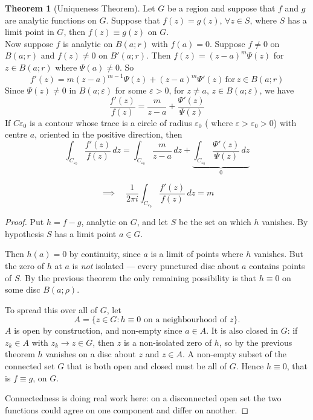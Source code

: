 \documentclass[11pt,a4paper]{article}
\theoremstyle{definition}
\newtheorem{thm}{Theorem}[section]
\begin{document}
\begin{thm}[Uniqueness Theorem]
Let $G$ be a region and suppose that $f$ and $g$ are analytic functions on $G$. Suppose that $f(z) = g(z),\,\forall z \in S$, where $S$ has a limit point in $G$, then $f(z) \equiv g(z)$ on $G$.\\

Now suppose $f$ is analytic on $B(a;r)$  with $f(a) = 0$.
Suppose $f\neq 0$ on $B(a;r)$ and $f(z)\neq 0$ on $B'(a;r)$.  Then $f(z) = (z - a)^m\Psi (z)$ for $z \in B(a;r)$ where $\Psi (a)\neq 0$. So $$f'(z) = m(z - a)^{m-1}\Psi (z) + (z- a)^m\Psi'(z)\,\text{for}\, z \in B(a;r)$$
Since $\Psi (z) \neq 0$ in $B(a;\varepsilon)$ for some $\varepsilon > 0$, for $z \neq a, \, z\in B(a;\varepsilon)$, we have $$\frac{f'(z)}{f(z)} = \frac{m}{z - a} + \frac{\Psi' (z)}{\Psi (z)}$$
If $C{\varepsilon_0}$ is a contour whose trace is a circle of radius $\varepsilon_0$ ( where $\varepsilon > \varepsilon_0 > 0$) with centre $a$, oriented in the positive direction, then $$\int_{C_{\varepsilon_0}}\frac{f'(z)}{f(z)}\,dz = \int_{C_{\varepsilon_0}} \frac{m}{z - a}\,dz +\underbrace{\int_{C_{\varepsilon_0}}\frac{\Psi'(z)}{\Psi (z)}\,dz}_0$$

$$\implies\quad  \frac{1}{2\pi i}\int_{C_{\varepsilon_0}}\frac{f'(z)}{f(z)}\,dz = m$$
\end{thm}

\begin{proof}
Put $h=f-g$, analytic on $G$, and let $S$ be the set on which $h$ vanishes.
By hypothesis $S$ has a limit point $a\in G$.

Then $h(a)=0$ by continuity, since $a$ is a limit of points where $h$ vanishes.
But the zero of $h$ at $a$ is \emph{not} isolated --- every punctured disc about
$a$ contains points of $S$. By the previous theorem the only remaining
possibility is that $h\equiv 0$ on some disc $B(a;\rho)$.

To spread this over all of $G$, let
$$A=\{z\in G: h\equiv 0 \text{ on a neighbourhood of } z\} .$$
$A$ is open by construction, and non-empty since $a\in A$. It is also closed in
$G$: if $z_k\in A$ with $z_k\rightarrow z\in G$, then $z$ is a non-isolated
zero of $h$, so by the previous theorem $h$ vanishes on a disc about $z$ and
$z\in A$. A non-empty subset of the connected set $G$ that is both open and
closed must be all of $G$. Hence $h\equiv 0$, that is $f\equiv g$, on $G$.

Connectedness is doing real work here: on a disconnected open set the two
functions could agree on one component and differ on another.
\end{proof}
\end{document}
